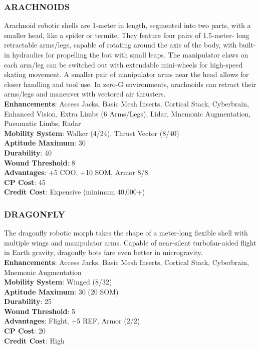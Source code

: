 \subsubsection{ARACHNOIDS}
Arachnoid robotic shells are 1-meter in length, segmented into two parts, with a smaller head, like a
spider or termite. They feature four pairs of 1.5-meter-
long retractable arms/legs, capable of rotating around
the axis of the body, with built-in hydraulics for
propelling the bot with small leaps. The manipulator claws on each arm/leg can be switched out with
extendable mini-wheels for high-speed skating
movement. A smaller pair of manipulator arms near
the head allows for closer handling and tool use. In
zero-G environments, arachnoids can retract their
arms/legs and maneuver with vectored air thrusters.
\\ \textbf{Enhancements}: Access Jacks, Basic Mesh Inserts,
Cortical Stack, Cyberbrain, Enhanced Vision, Extra
Limbs (6 Arms/Legs), Lidar, Mnemonic Augmentation, Pneumatic Limbs, Radar
\\ \textbf{Mobility System}: Walker (4/24), Thrust Vector (8/40)
\\ \textbf{Aptitude Maximum}: 30
\\ \textbf{Durability}: 40
\\ \textbf{Wound Threshold}: 8
\\ \textbf{Advantages}: +5 COO, +10 SOM, Armor 8/8
\\ \textbf{CP Cost}: 45
\\ \textbf{Credit Cost}: Expensive (minimum 40,000+)

\subsubsection{DRAGONFLY}
The dragonfly robotic morph takes the shape of a
meter-long flexible shell with multiple wings and manipulator arms. Capable of near-silent turbofan-aided
flight in Earth gravity, dragonfly bots fare even better
in microgravity.
\\ \textbf{Enhancements}: Access Jacks, Basic Mesh Inserts, Cortical Stack, Cyberbrain, Mnemonic Augmentation
\\ \textbf{Mobility System}: Winged (8/32)
\\ \textbf{Aptitude Maximum}: 30 (20 SOM)
\\ \textbf{Durability}: 25
\\ \textbf{Wound Threshold}: 5
\\ \textbf{Advantages}: Flight, +5 REF, Armor (2/2)
\\ \textbf{CP Cost}: 20
\\ \textbf{Credit Cost}: High

